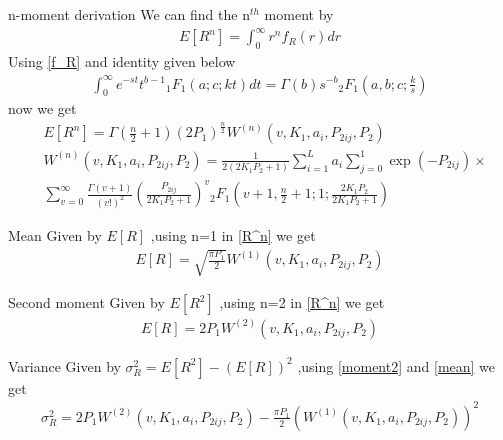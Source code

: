 \documentclass{beamer}
\begin{document}
\begin{frame}
\begin{block}{n-moment derivation}
We can find the n\(^{th}\) moment by 
\begin{align}
    E[R^n]=\int_0^\infty r^n f_R (r)dr
\end{align}
Using \eqref{f_R} and identity given below
\begin{align}
    \int_0^\infty e^{-st} t^{b-1} {}_{1} F_{1}(a;c;kt)dt =\Gamma(b) s^{-b} {}_{2}F_{1}(a,b;c;\frac{k}{s})
\end{align}
now we get 
\begin{align}
    &E[R^n]=\Gamma(\frac{n}{2}+1) (2P_1)^{\frac{n}{2}} W^{(n)}(v,K_1,a_i,P_{2ij},P_2) \label{R^n} \\\nonumber
    &W^{(n)}(v,K_1,a_i,P_{2ij},P_2)=\frac{1}{2(2K_1P_2+1)} \sum_{i=1}^{L} a_i  \sum_{j=0}^{1} 
     \exp(-P_{2ij})  \times \\ \nonumber
    &\sum_{v=0}^\infty \frac{\Gamma(v+1)}{(v!)^2}\left(\frac{P_{2ij}}{2K_1P_2+1}\right)^v
    {}_{2}F_{1}\left(v+1,\frac{n}{2}+1;1;\frac{2K_1 P_2}{2K_1 P_2 +1}\right)
\end{align}
\end{block}
\end{frame}
\begin{frame}{}
\begin{block}{Mean}
Given by \(E[R]\) ,using n=1 in \eqref{R^n} we get
    \begin{align}
        E[R]=\sqrt{\frac{\pi P_1}{2}}W^{(1)}(v,K_1,a_i,P_{2ij},P_2) \label{mean}
    \end{align}
\end{block}
\begin{block}{Second moment}
Given by \(E[R^2]\) ,using n=2 in \eqref{R^n} we get
    \begin{align}
        E[R]=2P_1 W^{(2)}(v,K_1,a_i,P_{2ij},P_2) \label{moment2}
    \end{align}
\end{block}
\begin{block}{Variance}
Given by \(\sigma_{R}^{2}=E[R^2]-(E[R])^2\) ,using \eqref{moment2} and \eqref{mean} we get
    \begin{align}
    \sigma_{R}^{2}= 2P_1 W^{(2)}(v,K_1,a_i,P_{2ij},P_2) - \frac{\pi P_1}{2}(W^{(1)}(v,K_1,a_i,P_{2ij},P_2))^2\label{variance}
    \end{align}
\end{block}
\end{frame}
\end{document}
